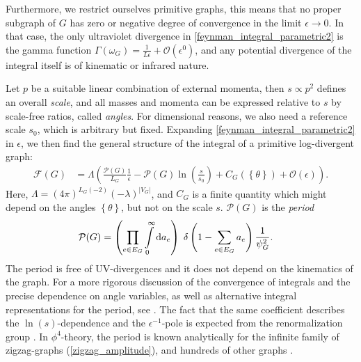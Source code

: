 \documentclass[12pt,a4paper]{article}
\newcommand{\abs}[1]{\lvert #1 \rvert}
\renewcommand{\d}{\textnormal{d}}
\newcommand{\period}{\mathcal P}
\renewcommand{\|}{\rule[-0.4ex]{0.2ex}{1.2em}}
\begin{document}
	
	Furthermore, we restrict ourselves primitive graphs, this means that no proper subgraph of $G$ has zero or negative degree of convergence in the limit $\epsilon \rightarrow 0$. In that case, the only ultraviolet divergence in \cref{feynman_integral_parametric2} is the gamma function $\Gamma(\omega_G)=\frac{1}{L \epsilon}+ \mathcal O \left( \epsilon^0 \right) $, and any potential divergence of the integral itself is    of kinematic or infrared nature.
	
	Let $p$ be a suitable linear combination of external momenta, then $s \propto p^2$ defines an overall \emph{scale}, and all masses and momenta can be expressed relative to $s$ by  scale-free ratios, called \emph{angles}. For dimensional reasons, we also need  a reference scale $s_0$, which is arbitrary but fixed.
	Expanding \cref{feynman_integral_parametric2} in $\epsilon$, we then find the general structure of the integral of a primitive log-divergent graph:
	\begin{align}\label{amplitude_period} 
		\mathcal F (G) &=\Lambda \left(  \frac{  \period (G)}{  L_G  } \frac{1}{\epsilon}- \period(G) \ln \left( \frac s {s_0}  \right)   +C_G\left( \left \lbrace \theta \right \rbrace   \right)   + \mathcal  O \left( \epsilon \right) \right).
	\end{align}
	Here,  $\Lambda = 	  (4\pi)^{ L_G  (- 2 )}    (- \lambda )^{\abs{V_G}} $,   and $C_G$ is a finite quantity which might depend on the angles $\left \lbrace \theta \right \rbrace  $, but not on the scale $s$. $\period(G)$ is the \emph{period}
	\begin{align}\label{def:period}
		\period (G)&=  \left( \prod_{e\in E_G} \int \limits_0^\infty \d a_e  \right)   \; \delta \left( 1-\sum_{e\in E_G}  a_e \right) \frac{1} {\psi_G^{ 2}}.
	\end{align}
	The period is free of UV-divergences and it does not depend on the kinematics of the graph.
	For a more rigorous discussion of the convergence of   integrals and the precise dependence on angle variables, as well as alternative integral representations for the period, see \cite{bloch_motives_2006,schnetz_quantum_2010,brown_angles_2013}. The fact that the same coefficient describes the $\ln(s)$-dependence and the $\epsilon^{-1}$-pole is expected from the renormalization group \cite{wilson_renormalization_1974}. In $\phi^4$-theory, the period is known analytically for the infinite family of zigzag-graphs (\cref{zigzag_amplitude}), and hundreds of other graphs  \cite{broadhurst_knots_1995,schnetz_quantum_2010,brown_singlevalued_2015,panzer_analytic_2013,panzer_galois_2017,schnetz_numbers_2018,schnetz_hyperlogprocedures_2023}.
	
\end{document}
